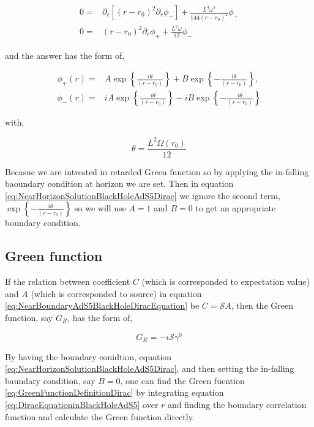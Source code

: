 \begin{align}
    0 =& \partial_r\left[(r-r_0)^2\partial_r \phi_{+}\right] + \frac{L^4\omega^2}{144(r-r_0)^2}\phi_{+}\nonumber\\
    0 =&  (r-r_0)^2 \partial_r \phi_{+} +  \frac{L^2\omega}{12} \phi_{-}
\end{align}

and the answer has the form of,

\begin{align} \label{eq:NearHorizonSolutionBlackHoleAdS5Dirac}
   \phi_{+}(r) =& A\exp\left\{\frac{i\theta}{(r-r_0)}\right\} + B\exp\left\{-\frac{i\theta}{(r-r_0)}\right\}, \nonumber\\
   \phi_{-}(r) =& iA\exp\left\{\frac{i\theta}{(r-r_0)}\right\} - iB\exp\left\{-\frac{i\theta}{(r-r_0)}\right\}
\end{align}

with,

\begin{equation}
   \theta = \frac{L^2\Omega(r_0)}{12}
\end{equation}

Becasue we are intrested in retarded Green function so by applying the in-falling baoundary condition at horizon we are set. Then in equation \ref{eq:NearHorizonSolutionBlackHoleAdS5Dirac} we ignore the second term, $\exp\left\{-\frac{i\theta}{(r-r_0)}\right\}$ so we will use $A=1$ and $B=0$ to get an appropriate boundary condition. 

\subsection{Green function}

If the relation between coefficient $C$ (which is corresponded to expectation value) and $A$ (which is corresponded to source) in equation \ref{eq:NearBoundaryAdS5BlackHoleDiracEquation} be $C=\mathcal{S}A$, then the Green function, say $G_R$, has the form of,

\begin{equation} \label{eq:GreenFunctionDefinitionDirac}
   G_R = -i\mathcal{S}\gamma^0
\end{equation}  

By having the boundary conidtion, equation \ref{eq:NearHorizonSolutionBlackHoleAdS5Dirac}, and then setting the in-falling baundary condition, say $B=0$, one can find the Green fucntion \ref{eq:GreenFunctionDefinitionDirac} by integrating equation \ref{eq:DiracEquationinBlackHoleAdS5} over $r$ and finding the boundary correlation function and calculate the Green function directly. 

